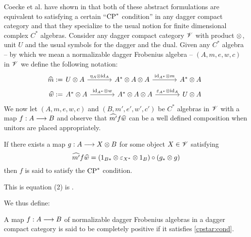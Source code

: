 Coecke et al. have shown in \cite[Prop. 3.4]{channels} that both of these
abstract formulations are equivalent to satisfying a certain ``$\CPS$
condition'' in any dagger compact category and that they specialize to the usual
notion for finite dimensional complex $C^*$ algebras. Consider any dagger
compact category $\mathscr{V}$ with product $\otimes$, unit $U$ and the usual symbols for
the dagger and the dual. Given any $C^*$ algebra -- by which we mean a
normalizable dagger Frobenius algebra -- $(A, m, e, w, c)$ in $\mathscr{V}$ we define
the following notation:
\begin{eqnarray*}
  \wh{m} :=&
  \begin{tikzcd}[column sep=large]
    U \m A \arrow[r, "\eta_A \m \id_A"] &
    A^* \m A \m A \arrow[r, "\id_{A^*} \m m"] &
    A^* \m A
  \end{tikzcd}\\
  \wh{w} :=&
  \begin{tikzcd}[column sep=large]
    A^* \m A \arrow[r, "\id_{A^*} \m w"] &
    A^* \m A \m A \arrow[r, "\eps_{A^*} \m \id_{A}"] &
    U \m A
  \end{tikzcd}
\end{eqnarray*}
We now let $(A, m, e, w, c)$ and $(B, m', e', w', c')$ be $C^*$ algebras in
$\mathscr{V}$ with a map $f : A \stackrel{}{\longrightarrow} B$ and observe that $\widehat{m'} f \widehat{w}$ can be a
well defined composition when unitors are placed appropriately.
\begin{defn}
If there exists a map $g : A \stackrel{}{\longrightarrow} X \otimes B$ for some object $X \in \mathscr{V}$
satisfying
\begin{equation}\label{cpstar:cond}
  \widehat{m'}f\widehat{w} = (1_{B*} \otimes \varepsilon_{X^*} \otimes 1_{B}) \circ (g_* \otimes g)
\end{equation}
then $f$ is said to satisfy the $\CPS$ condition.
\end{defn}

\begin{rmk}
This is equation (2) is \cite[13]{channels}.
\end{rmk}

We thus define:
\begin{defn}
A map $f : A \stackrel{}{\longrightarrow} B$ of normalizable dagger Frobenius algebras in a dagger
compact category is said to be completely positive if it satisfies
\eqref{cpstar:cond}.
\end{defn}

